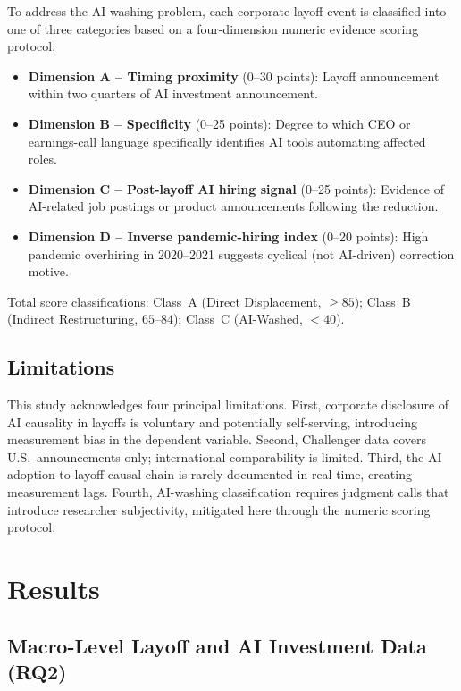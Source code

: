 \documentclass[12pt, a4paper]{article}
\begin{document}
To address the AI-washing problem, each corporate layoff event is classified into one of
three categories based on a four-dimension numeric evidence scoring protocol:

\begin{itemize}
  \item \textbf{Dimension A -- Timing proximity} (0--30 points): Layoff announcement within
        two quarters of AI investment announcement.
  \item \textbf{Dimension B -- Specificity} (0--25 points): Degree to which CEO or earnings-call
        language specifically identifies AI tools automating affected roles.
  \item \textbf{Dimension C -- Post-layoff AI hiring signal} (0--25 points): Evidence of
        AI-related job postings or product announcements following the reduction.
  \item \textbf{Dimension D -- Inverse pandemic-hiring index} (0--20 points): High pandemic
        overhiring in 2020--2021 suggests cyclical (not AI-driven) correction motive.
\end{itemize}

Total score classifications: Class~A (Direct Displacement, $\geq 85$); Class~B (Indirect
Restructuring, $65$--$84$); Class~C (AI-Washed, $< 40$).

\subsection{Limitations}

This study acknowledges four principal limitations. First, corporate disclosure of AI
causality in layoffs is voluntary and potentially self-serving, introducing measurement
bias in the dependent variable. Second, Challenger data covers U.S.\ announcements only;
international comparability is limited. Third, the AI adoption-to-layoff causal chain is
rarely documented in real time, creating measurement lags. Fourth, AI-washing classification
requires judgment calls that introduce researcher subjectivity, mitigated here through the
numeric scoring protocol.

\section{Results}

\subsection{Macro-Level Layoff and AI Investment Data (RQ2)}
\end{document}
